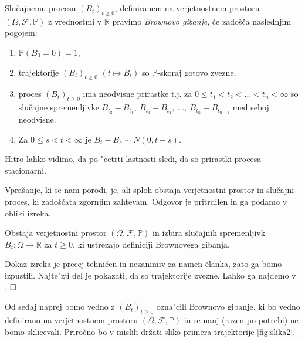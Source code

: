 \documentclass[twoside,11pt]{article}
\begin{document}
\pagebreak

\begin{definicija}
    Slučajnemu procesu $(B_t)_{t\geq 0}$, definiranem na verjetnostnem prostoru $(\Omega, \mathcal{F}, \mathbb{P})$
    z vrednostmi v $\mathbb{R}$ pravimo \textit{Brownovo gibanje}, če 
    zadošča naslednjim pogojem:
    \begin{enumerate}
        \item $\mathbb{P}(B_0 = 0) = 1$,
        \item trajektorije $(B_t)_{t\geq0}$ $(t \mapsto B_t)$ so $\mathbb{P}$-skoraj gotovo zvezne,
        \item proces $\left(B_t\right)_{t \geq 0}$ ima neodvisne prirastke t.j. za $0 \leq t_1 < t_2 < \ldots < t_n < \infty$ so slučajne spremenljivke
            $B_{t_2} - B_{t_1}, \ B_{t_3} - B_{t_2}, \ \ldots, \ B_{t_n} - B_{t_{n-1}}$ med seboj neodvisne. 
        \item Za $ 0 \leq s < t < \infty$ je $B_t - B_s \sim N(0, t-s)$.
    \end{enumerate}
\end{definicija}

\begin{opomba}
    Hitro lahko vidimo, da po "cetrti lastnosti sledi, da so prirastki procesa stacionarni.
\end{opomba}

Vprašanje, ki se nam porodi, je, ali sploh obstaja verjetnostni prostor 
in slučajni proces, ki zadoščata zgornjim zahtevam. Odgovor je pritrdilen in ga
podamo v obliki izreka.

\begin{izrek}
    Obstaja verjetnostni prostor $(\Omega, \mathcal{F}, \mathbb{P})$ in
    izbira slučajnih spremenljivk $B_t : \Omega \to \mathbb{R}$ za $t \geq 0$,
    ki ustrezajo definiciji Brownovega gibanja.
\end{izrek}

\begin{dokaz}
    Dokaz izreka je precej tehničen in nezanimiv za namen članka, zato ga bomo izpustili. Najte"zji del je 
    pokazati, da so trajektorije zvezne. Lahko ga najdemo v \cite{1}. $\hfill \square$
\end{dokaz}


Od sedaj naprej bomo vedno z $(B_t)_{t\geq 0}$ ozna"cili Brownovo gibanje, ki bo vedno definirano na 
verjetnostnem prostoru $(\Omega, \mathcal{F}, \mathbb{P})$ in se nanj (razen po potrebi) ne 
bomo sklicevali. Priročno bo v mislih držati sliko primera trajektorije  \ref{fig:slika2}.
\end{document}
